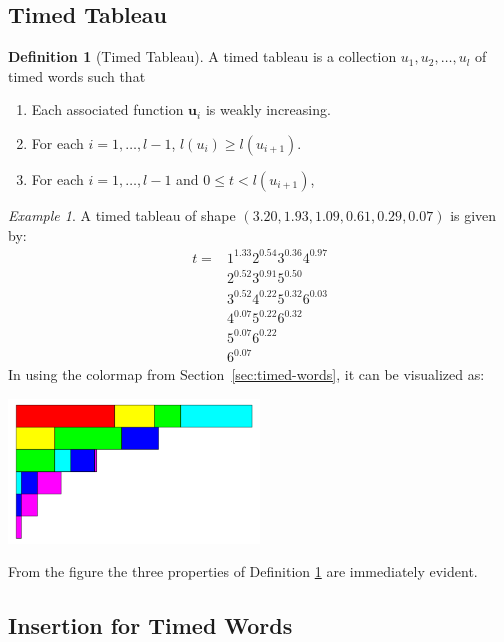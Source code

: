 \documentclass[10pt]{amsproc}
\theoremstyle{definition}
\newtheorem{definition}[theorem]{Definition}
\theoremstyle{remark}
\newtheorem{example}[theorem]{Example}
\begin{document}
\subsection{Timed Tableau}
\label{sec:Timed-Tableau}
\begin{definition}
  [Timed Tableau]
  \label{definition:timed-tableau}
  A timed tableau is a collection $u_1,u_2,\dotsc, u_l$ of timed words such that
  \begin{enumerate}
  \item Each associated function $\mathbf u_i$ is weakly increasing.
  \item For each $i=1,\dotsc,l-1$, $l(u_i)\geq l(u_{i+1})$.
  \item For each $i=1,\dotsc,l-1$ and $0\leq t<l(u_{i+1})$, 
  \end{enumerate}
\end{definition}
\begin{example}
  A timed tableau of shape $(3.20,1.93,1.09,0.61,0.29,0.07)$ is given by:
  \begin{align*}
    t = & 1^{1.33}2^{0.54}3^{0.36}4^{0.97}\\
    & 2^{0.52}3^{0.91}5^{0.50}\\
    &3^{0.52}4^{0.22}5^{0.32}6^{0.03}\\
    &4^{0.07}5^{0.22}6^{0.32}\\
    &5^{0.07}6^{0.22}\\
    &6^{0.07}
  \end{align*}
  In using the colormap from Section~\ref{sec:timed-words}, it can be visualized as:
  \begin{center}
    \includegraphics[width=0.5\textwidth]{tableau.png}
  \end{center}
  From the figure the three properties of Definition \ref{definition:timed-tableau} are immediately evident.
\end{example}
\subsection{Insertion for Timed Words}
\label{sec:insertion-timed-words}
\end{document}
